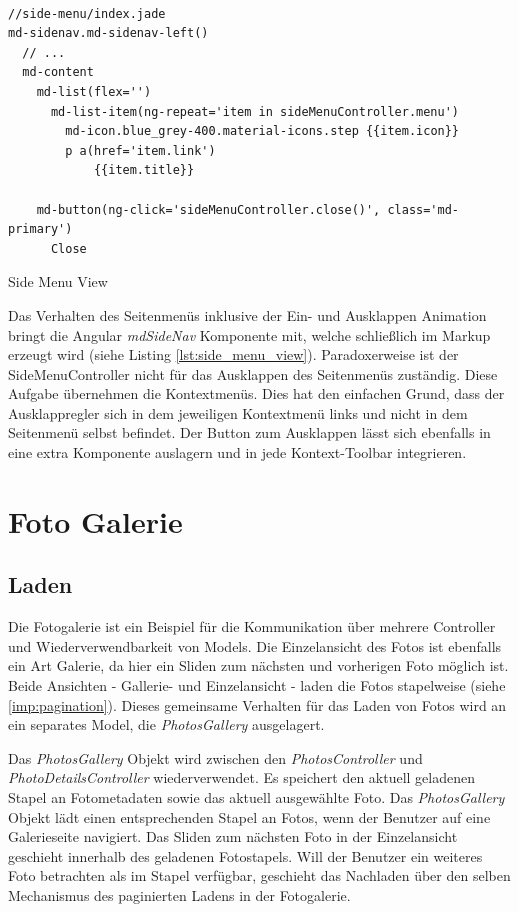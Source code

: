 \begin{listing}[H]
\begin{verbatim}

//side-menu/index.jade
md-sidenav.md-sidenav-left()
  // ...
  md-content
    md-list(flex='')
      md-list-item(ng-repeat='item in sideMenuController.menu')
        md-icon.blue_grey-400.material-icons.step {{item.icon}}
        p a(href='item.link')
            {{item.title}}

    md-button(ng-click='sideMenuController.close()', class='md-primary')
      Close

\end{verbatim}
\caption{Side Menu View}
\label{lst:side_menu_view}
\end{listing}

Das Verhalten des Seitenmenüs inklusive der Ein- und Ausklappen Animation bringt die Angular \textit{mdSideNav} Komponente mit, welche schließlich im Markup erzeugt wird (siehe Listing \ref{lst:side_menu_view}). Paradoxerweise ist der SideMenuController nicht für das Ausklappen des Seitenmenüs zuständig. Diese Aufgabe übernehmen die Kontextmenüs. Dies hat den einfachen Grund, dass der Ausklappregler sich in dem jeweiligen Kontextmenü links und nicht in dem Seitenmenü selbst befindet. Der Button zum Ausklappen lässt sich ebenfalls in eine extra Komponente auslagern und in jede Kontext-Toolbar integrieren.

\section{Foto Galerie}
\label{sec:photo_gallery}

\subsection{Laden}

Die Fotogalerie ist ein Beispiel für die Kommunikation über mehrere Controller und Wiederverwendbarkeit von Models. Die Einzelansicht des Fotos ist ebenfalls ein Art Galerie, da hier ein Sliden zum nächsten und vorherigen Foto möglich ist. Beide Ansichten - Gallerie- und Einzelansicht - laden die Fotos stapelweise (siehe \ref{imp:pagination}). Dieses gemeinsame Verhalten für das Laden von Fotos wird an ein separates Model, die \textit{PhotosGallery} ausgelagert.

Das \textit{PhotosGallery} Objekt wird zwischen den \textit{PhotosController} und \textit{PhotoDetailsController} wiederverwendet. Es speichert den aktuell geladenen Stapel an Fotometadaten sowie das aktuell ausgewählte Foto. Das \textit{PhotosGallery} Objekt lädt einen entsprechenden Stapel an Fotos, wenn der Benutzer auf eine Galerieseite navigiert. Das Sliden zum nächsten Foto in der Einzelansicht geschieht innerhalb des geladenen Fotostapels. Will der Benutzer ein weiteres Foto betrachten als im Stapel verfügbar, geschieht das Nachladen über den selben Mechanismus des paginierten Ladens in der Fotogalerie.

